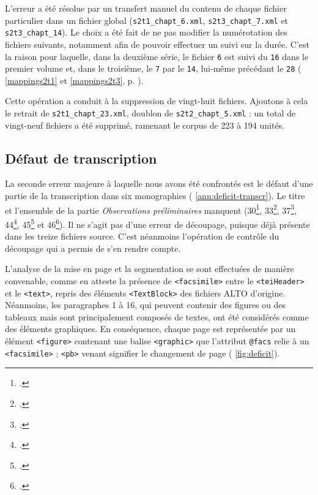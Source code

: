 L'erreur a été résolue par un transfert manuel du contenu de chaque fichier particulier dans un fichier global (\texttt{s2t1\_chapt\_6.xml}, \texttt{s2t3\_chapt\_7.xml} et \texttt{s2t3\_chapt\_14}). Le choix a été fait de ne pas modifier la numérotation des fichiers suivants, notamment afin de pouvoir effectuer un suivi sur la durée. C'est la raison pour laquelle, dans la deuxième série, le fichier \texttt{6} est suivi du \texttt{16} dans le premier volume et, dans le troisième, le  \texttt{7} par le \texttt{14}, lui-même précédant le \texttt{28} (\ann{} \ref{mappings2t1} et \ref{mappings2t3}, p. \pageref{mappings2t1}).

Cette opération a conduit à la suppression de vingt-huit fichiers. Ajoutons à cela le retrait de \texttt{s2t1\_chapt\_23.xml}, doublon de \texttt{s2t2\_chapt\_5.xml} : un total de vingt-neuf fichiers a été supprimé, ramenant le corpus de 223 à 194 unités.

\subsection{Défaut de transcription}

La seconde erreur majeure à laquelle nous avons été confrontés est le défaut d'une partie de la transcription dans six monographies (\ann{} \ref{ann:deficit-transcr}). Le titre et l'ensemble de la partie \textit{Observations préliminaires} manquent (\nos{}30\footcite{mono030a}, 33\footcite{mono033a}, 37\footcite{mono037a}, 44\footcite{mono044a}, 45\footcite{mono045a} et 46\footcite{mono046a}). Il ne s'agit pas d'une erreur de découpage, puisque déjà présente dans les treize fichiers source. C'est néanmoins l'opération de contrôle du découpage qui a permis de s'en rendre compte.

L'analyse de la mise en page et la segmentation se sont effectuées de manière convenable, comme en atteste la présence de \texttt{<facsimile>} entre le \texttt{<teiHeader>} et le \texttt{<text>}, repris des éléments \texttt{<TextBlock>} des fichiers ALTO d'origine. Néanmoins, les paragraphes 1 à 16, qui peuvent contenir des figures ou des tableaux mais sont principalement composés de textes, ont été considérés comme des éléments graphiques. En conséquence, chaque page est représentée par un élément \texttt{<figure>} contenant une balise \texttt{<graphic>} que l'attribut \texttt{@facs} relie à un \texttt{<facsimile>} ; \texttt{<pb>} venant signifier le changement de page (\fig{} \ref{fig:deficit}).

